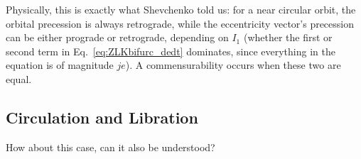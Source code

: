 \documentclass[12pt]{article}
\begin{document}
Physically, this is exactly what Shevchenko told us: for a near circular orbit,
the orbital precession is always retrograde, while the eccentricity vector's
precession can be either prograde or retrograde, depending on $I_1$ (whether the
first or second term in Eq.~\ref{eq:ZLKbifurc_dedt} dominates, since everything
in the equation is of magnitude $je$).
A commensurability occurs when these two are equal.

\subsection{Circulation and Libration}

How about this case, can it also be understood?
\end{document}
